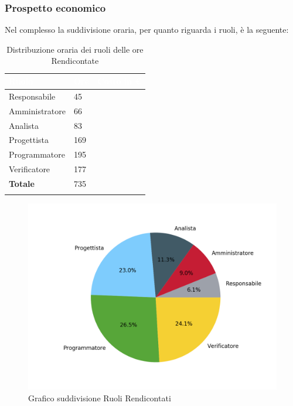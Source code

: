 \subsubsection{Prospetto economico}
Nel complesso la suddivisione oraria, per quanto riguarda i ruoli, è la seguente: 


\begin{longtable}{| C{.30\textwidth}| C{.15\textwidth}| C{.20\textwidth}|}
\hline
{}\textbf{\textcolor{white}{Ruolo}} & \textbf{\textcolor{white}{Ore}} & \textbf{\textcolor{white}{Costo in \euro}} \\
\hline
Responsabile & 45 &  \\
\hline
{}Amministratore & 66 &  \\
\hline
Analista & 83 &  \\
\hline
{}Progettista & 169 & \\
\hline 
Programmatore & 195 &  \\
\hline
{}Verificatore & 177 &  \\
\hline 
\textbf{Totale} & 735 & \\
\hline

\caption{Distribuzione oraria dei ruoli delle ore Rendicontate}
\label{Distribuzione oraria a carico del committente}
\end{longtable}

\begin{figure}[H]
	\centering
  		\includegraphics[width=1\linewidth]{./images/torta_to.png}
  		\caption{Grafico suddivisione Ruoli Rendicontati}
  		\label{fig:grafico suddivione ruoli}
\end{figure}


